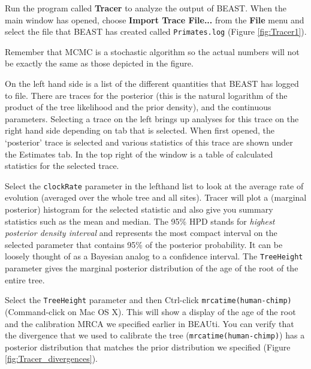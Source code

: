 \documentclass[11pt]{article}
\theoremstyle{plain}%
\theoremstyle{definition}
\theoremstyle{remark}
\begin{document}
Run the program called {\bf Tracer} to analyze the output of BEAST. When the main
window has opened, choose {\bf Import Trace File...} from the {\bf File} menu and select the file that
BEAST has created called \texttt{Primates.log} (Figure \ref{fig:Tracer1}).

Remember that MCMC is a stochastic algorithm so the actual numbers will not be exactly the same as those depicted in the figure.

On the left hand side is a list of the different quantities that BEAST has logged to file. 
There are traces for the posterior (this
is the natural logarithm of the product of the tree likelihood and the prior density), and the continuous parameters. Selecting a trace
on the left brings up analyses for this trace on the right hand side depending on tab that is selected. When first opened, the
`posterior' trace is selected and various statistics of this trace are shown under the Estimates tab.
In the top right of the window is a table of calculated statistics for the selected trace. 

Select the \texttt{clockRate} parameter in the lefthand list to look at
the average rate of evolution (averaged over the whole tree and all sites). Tracer will plot a (marginal posterior) histogram for the selected statistic and also give you
summary statistics such as the mean and median. The 95\% HPD stands for {\it highest posterior density interval} and represents the most compact interval on the selected parameter that contains 95\% of the posterior probability. It can be loosely thought of as a Bayesian analog to a confidence interval. The \texttt{TreeHeight} parameter gives the marginal posterior distribution of the age of the root of the entire tree.

Select the \texttt{TreeHeight} parameter and then Ctrl-click \texttt{mrcatime(human-chimp)}  (Command-click on Mac OS X). This will show a display of the age of the root and the calibration MRCA we specified earlier in BEAUti. You can verify that the divergence that we used to calibrate the tree
(\texttt{mrcatime(human-chimp)}) has a posterior distribution that matches the prior distribution we specified (Figure \ref{fig:Tracer_divergences}).
\end{document}
